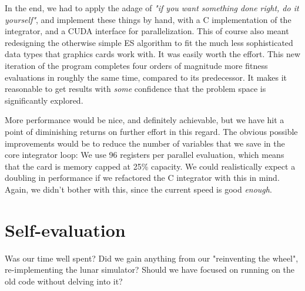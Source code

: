In the end, we had to apply the adage of \textit{"if you want something done right, do it yourself"}, and implement these things by hand, with a C implementation of the integrator, and a CUDA interface for parallelization. This of course also meant redesigning the otherwise simple ES algorithm to fit the much less sophisticated data types that graphics cards work with. It was easily worth the effort. This new iteration of the program completes four orders of magnitude more fitness evaluations in roughly the same time, compared to its predecessor. It makes it reasonable to get results with \textit{some} confidence that the problem space is significantly explored. 

More performance would be nice, and definitely achievable, but we have hit a point of diminishing returns on further effort in this regard. The obvious possible improvements would be to reduce the number of variables that we save in the core integrator loop: We use 96 registers per parallel evaluation, which means that the card is memory capped at 25\% capacity. We could realistically expect a doubling in performance if we refactored the C integrator with this in mind. Again, we didn't bother with this, since the current speed is good \textit{enough}.

\section{Self-evaluation}
Was our time well spent? Did we gain anything from our "reinventing the wheel", re-implementing the lunar simulator? Should we have focused on running on the old code without delving into it?